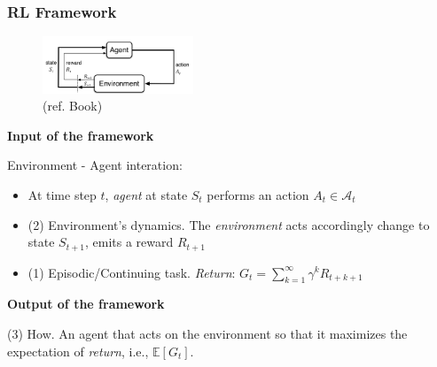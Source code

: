 \documentclass[10pt]{beamer}
\theoremstyle{remark}
\begin{document}
\begin{frame}
    \frametitle{RL Framework}
    \begin{figure}
        \includegraphics[width=0.4\textwidth]{figures/agent-environment.png}
        \caption{(ref. Book)}
   \end{figure}
   \textbf{Input of the framework}

   Environment - Agent interation:
   \begin{itemize}
       \item At time step $t$, \textit{agent} at state $S_t$ performs an action $A_t \in \mathcal{A}_t$
       \item {\color{blue} (2) Environment's dynamics.} The \textit{environment} acts accordingly change to state $S_{t+1}$, emits a reward $R_{t+1}$
       \item {\color{blue} (1) Episodic/Continuing task.} \textit{Return}: $G_t = \sum^{\infty}_{k=1} \gamma^{k}R_{t+k+1}$
   \end{itemize}
   \textbf{Output of the framework}

   {\color{blue} (3) How.} An agent that acts on the environment so that it maximizes the expectation of \textit{return}, i.e., $ \mathbb{E}[G_t]$.
\end{frame}
\end{document}
